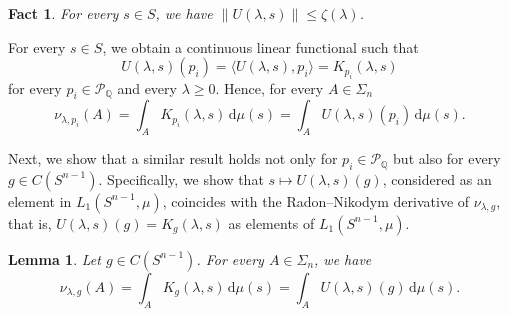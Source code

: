\documentclass[11pt, a4paper]{amsart}
\newtheorem{lemma}[proposition]{Lemma}
\newtheorem{observation}[proposition]{Fact}
\renewcommand{\d}{\,\mathrm{d}}
\newcommand{\cm}{\zeta}
\newcommand{\sn}{{S^{n-1}}}
\renewcommand{\d}{\,\mathrm{d}}
\newcommand{\poly}{\mathcal P_{\mathbb Q}}
\begin{document}
\begin{observation}\label{ob:bounded}
For every $s\in S$, we have $\|U(\lambda, s)\|\leq \cm(\lambda)$.
\end{observation}

For every $s\in S$, we obtain a continuous linear functional such that
\[
    U(\lambda,s)(p_i)=\langle U(\lambda,s),p_i\rangle=K_{p_i}(\lambda,s)
\]
for every $p_i\in\poly$ and every $\lambda\geq0$. Hence, for every $A\in\Sigma_n$
\[
    \nu_{\lambda,p_i}(A)=\int_AK_{p_i}(\lambda,s)\d \mu(s)=\int_A U(\lambda,s)(p_i)\d \mu(s).
\]

Next, we show that a similar result holds not only for $p_i\in\mathcal P_{\mathbb Q}$ but also for every $g\in C(\sn )$.
Specifically, we show that $s\mapsto U(\lambda,s)(g)$, considered as an element in $L_1(\sn,\mu)$, coincides with the Radon--Nikodym derivative of $\nu_{\lambda,g}$, that is, $U(\lambda, s)(g)=K_{g}(\lambda,s)$ as elements of $L_1(\sn,\mu)$. 

\begin{lemma}\label{l:Uforg}
Let $g\in C(\sn )$. For every $A\in \Sigma_n$, we have 
$$
\nu_{\lambda,g}(A) = \int_A K_{g}(\lambda, s) \d \mu(s) = \int_A U(\lambda,s)(g) \d \mu(s).
$$
\end{lemma}
\end{document}
